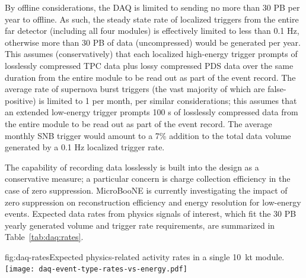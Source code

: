 By offline considerations, the DAQ is limited to sending no more than 30 PB per
year to offline.
As such, the steady state rate of localized triggers from the entire far
detector (including all four modules) is effectively limited to less than 0.1
Hz, otherwise more than 30 PB of data (uncompressed) would be generated per
year.
This assumes (conservatively) that each localized high-energy trigger prompts
\dpreadout of losslessly compressed TPC data plus lossy compressed PDS data over
the same duration from the entire module to be read out as part of the event
record.
The average rate of supernova burst triggers (the vast majority of which are
false-positive) is limited to 1 per month, per similar considerations; this
assumes that an extended low-energy trigger prompts 100 s of losslessly
compressed data from the entire module to be read out as part of the event
record.
The average monthly SNB trigger would amount to a 7\% addition to the total data
volume generated by a 0.1 Hz localized trigger rate.

The capability of recording data losslessly is built into the design as a
conservative measure; a particular concern is charge collection efficiency in
the case of zero suppression. 
MicroBooNE is currently investigating the impact of zero suppression on
reconstruction efficiency and energy resolution for low-energy events. 
Expected data rates from physics signals of interest, which fit the 30 PB yearly
generated volume and trigger rate requirements, are summarized in
Table~\ref{tab:daq:rates}.

\begin{dunefigure}{fig:daq-rates}{Expected physics-related activity
    rates in a single \SI{10}{\kilo\tonne} module. \label{sec:daq:rates}
}
  \texttt{[image: daq-event-type-rates-vs-energy.pdf]}
\end{dunefigure}

